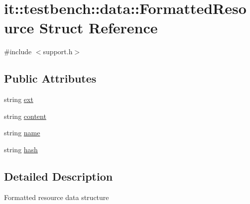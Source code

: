 \hypertarget{structit_1_1testbench_1_1data_1_1FormattedResource}{\section{it\-:\-:testbench\-:\-:data\-:\-:Formatted\-Resource Struct Reference}
\label{d6/d64/structit_1_1testbench_1_1data_1_1FormattedResource}
}


{\ttfamily \#include $<$support.\-h$>$}

\subsection*{Public Attributes}
\begin{DoxyCompactItemize}
\item 
string \hyperlink{structit_1_1testbench_1_1data_1_1FormattedResource_a59578a9c7075439bb47d4f2262ecf71b}{ext}
\item 
string \hyperlink{structit_1_1testbench_1_1data_1_1FormattedResource_a911f5361ebeec67555aaafa516e0a666}{content}
\item 
string \hyperlink{structit_1_1testbench_1_1data_1_1FormattedResource_a42c6eb1cc1f6eef3df854e766aec346c}{name}
\item 
string \hyperlink{structit_1_1testbench_1_1data_1_1FormattedResource_aef2dc570d20d23972359bcd7bbc8b74e}{hash}
\end{DoxyCompactItemize}


\subsection{Detailed Description}
Formatted resource data structure 


